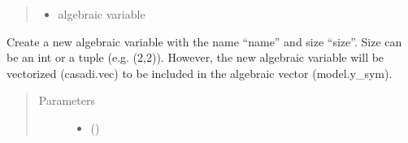 \documentclass[letterpaper,10pt,english]{sphinxmanual}
\begin{document}
\begin{fulllineitems}
\begin{fulllineitems}
\begin{quote}
\begin{description}
\begin{itemize}
\item {} 
 \textendash{} algebraic variable

\end{itemize}

\end{description}\end{quote}

\end{fulllineitems}


\begin{fulllineitems}
\label{\detokenize{yaocptool.modelling:yaocptool.modelling.system_model.SystemModel.convert_expr_from_tau_to_time}}
\end{fulllineitems}


\begin{fulllineitems}
\label{\detokenize{yaocptool.modelling:yaocptool.modelling.system_model.SystemModel.convert_expr_from_time_to_tau}}
\end{fulllineitems}


\begin{fulllineitems}
\label{\detokenize{yaocptool.modelling:yaocptool.modelling.system_model.SystemModel.create_algebraic_variable}}
Create a new algebraic variable with the name “name” and size “size”.
Size can be an int or a tuple (e.g. (2,2)). However, the new algebraic variable will be vectorized (casadi.vec)
to be included in the algebraic vector (model.y\_sym).
\begin{quote}\begin{description}
\item[{Parameters}] \leavevmode\begin{itemize}
\item {} 
 () \textendash{} 


\end{itemize}
\end{description}
\end{quote}
\end{fulllineitems}
\end{fulllineitems}
\end{document}
